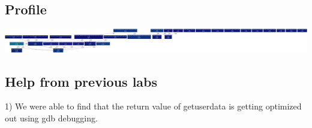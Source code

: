 \documentclass{article}
\begin{document}
\subsection{Profile}
\includegraphics[width=6in]{profile}
\subsection{Help from previous labs}
1) We were able to find that the return value of getuserdata is getting optimized out using gdb debugging.\\


\end{document}
